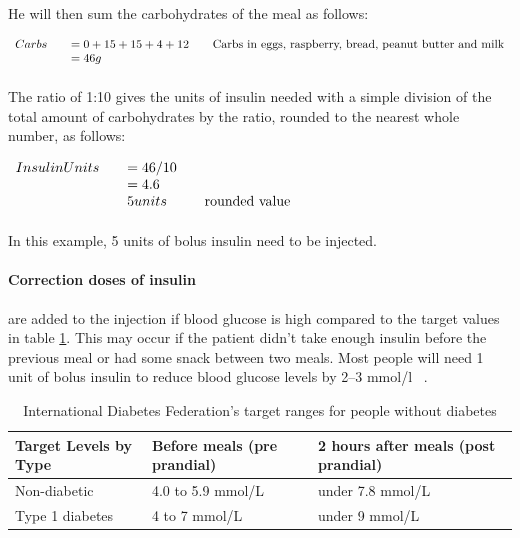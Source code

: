 He will then sum the carbohydrates of the meal as follows:

$\begin{array}{l l l}
    Carbs & \quad  = 0 + 15 + 15 + 4 + 12   & \quad \textrm{Carbs in eggs, raspberry, bread, peanut butter and milk}\\
         & \quad = 46 g   
  \end{array}$
  
\paragraph{}
The ratio of 1:10 gives the units of insulin needed with a simple division of the total amount of carbohydrates by the ratio, rounded to the nearest whole number, as follows:

$\begin{array}{l l l}
    InsulinUnits & \quad  = 46/10 \\
         & \quad = 4.6  \\
         & \quad 5 units & \quad \textrm{rounded value}
  \end{array}$
\paragraph{}
In this example, 5 units of bolus insulin need to be injected. 

\paragraph{Correction doses of insulin} are added to the injection if blood glucose is high compared to the target values in table \ref{table:targetValues}. This may occur if the patient didn't take enough insulin before the previous meal or had some snack between two meals. Most people will need 1 unit of bolus insulin to reduce blood glucose levels by 2–3 mmol/l ~\cite{carbcountPdf}. 


\begin{table}
    \begin{tabular}{|l|l|l|}
    \hline
    Target Levels by Type & Before meals (pre prandial) & 2 hours after meals (post prandial) \\ \hline
    Non-diabetic          & 4.0 to 5.9 mmol/L           & under 7.8 mmol/L                    \\ 
    Type 1 diabetes       & 4 to 7 mmol/L               & under 9 mmol/L                      \\ \hline
    \end{tabular}
    
    \caption{International Diabetes Federation's target ranges for people without diabetes}
    \label{table:targetValues}
\end{table}


